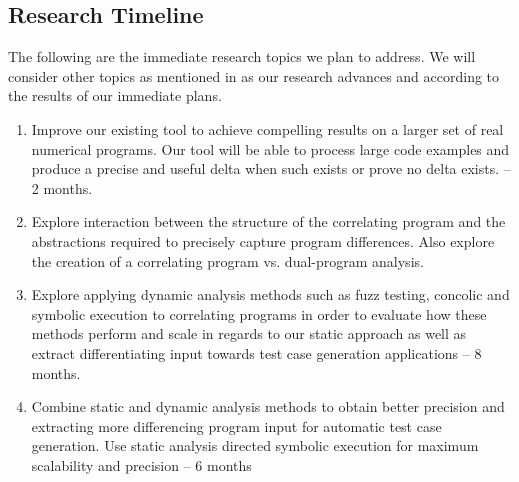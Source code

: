 \subsection{Research Timeline}
The following are the immediate research topics we plan to address. We will consider other topics as mentioned in  as our research advances and according to the results of our immediate plans.

\begin{enumerate}
\item Improve our existing tool to achieve compelling results on a larger set of real numerical programs. Our tool will be able to process large code examples and produce a precise and useful delta when such exists or prove no delta exists. -- 2 months.
\item Explore interaction between the structure of the correlating program and the abstractions required to precisely capture program differences. Also explore the creation of a correlating program vs. dual-program analysis. 
\item Explore applying dynamic analysis methods such as fuzz testing, concolic and symbolic execution to correlating programs in order to evaluate how these methods perform and scale in regards to our static approach as well as extract differentiating input towards test case generation applications -- 8 months.
\item Combine static and dynamic analysis methods to obtain better precision and extracting more differencing program input for automatic test case generation. Use static analysis directed symbolic execution for maximum scalability and precision -- 6 months
\end{enumerate}
